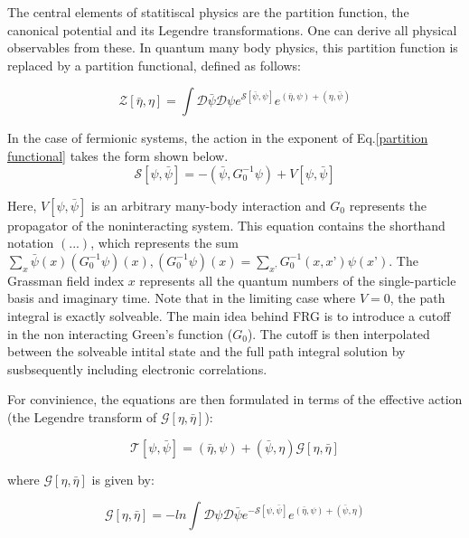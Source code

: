 \documentclass[12pt]{article}
\begin{document}
The central elements of statitiscal physics are the partition function, the canonical potential and its Legendre transformations. One can derive all physical observables from these. In quantum many body physics, this partition function is replaced by a partition functional, defined as follows:

\begin{equation}\label{partition functional}
    \mathcal{Z}[\bar{\eta}, \eta] = \int \mathcal{D} \bar{\psi} \mathcal{D}\psi e^{\mathcal{S}[\bar{\psi}, \psi]}e^{(\bar{\eta}, \psi)+(\eta, \bar{\psi})}
\end{equation}

\noindent In the case of fermionic systems, the action in the exponent of Eq.\ref{partition functional} takes the form shown below.
\begin{equation} \label{action}
    \mathcal{S}[\psi, \bar{\psi}] = -(\bar{\psi}, G_0^{-1} \psi) + V[\psi, \bar{\psi}]
\end{equation}

\noindent Here, $V[\psi, \bar{\psi}]$ is an arbitrary many-body interaction and $G_0$ represents the propagator of the noninteracting system. This equation contains the shorthand notation $(...)$, which represents the sum $\sum_x \bar{\psi}(x)(G_0^{-1}\psi)(x), (G_0^{-1}\psi)(x) = \sum_{x’}G_0^{-1}(x,x’)\psi(x’)$. The Grassman field index $x$ represents all the quantum numbers of the single-particle basis and imaginary time.
Note that in the limiting case where $V=0$, the path integral is exactly solveable. The main idea behind FRG is to introduce a cutoff in the non interacting Green's function ($G_0$). 
The cutoff is then interpolated between the solveable intital state and the full path integral solution by susbsequently including electronic correlations. \par

\medskip

\noindent For convinience, the equations are then formulated in terms of the effective action (the Legendre transform of $\mathcal{G}[\eta, \bar{\eta}]$):

\begin{equation} \label{Effective action}
    \mathcal{T}[\psi, \bar{\psi}] = (\bar{\eta},\psi) + (\bar{\psi},\eta) \mathcal{G}[\eta, \bar{\eta}]
\end{equation}

\noindent where $\mathcal{G}[\eta, \bar{\eta}]$ is given by:

\begin{equation}\label{G term in effective action}
    \mathcal{G}[\eta, \bar{\eta}] = 
    -ln \int{\mathcal{D}\psi \mathcal{D} \bar{\psi}e^{-\mathcal{S}[\psi, \bar{\psi}]}e^{(\bar{\eta}, \psi) +(\bar{\psi}, \eta)}}
\end{equation}
\end{document}
